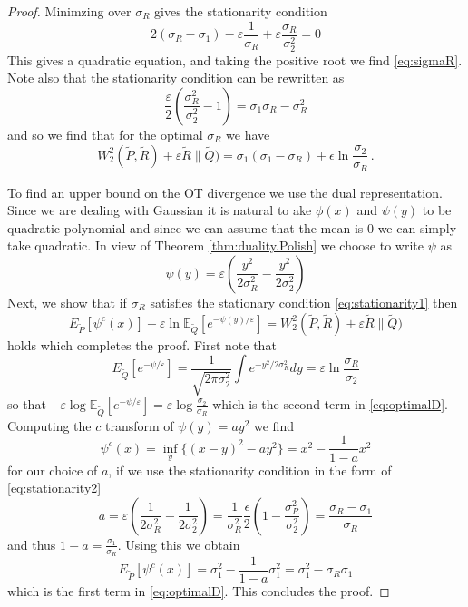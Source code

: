 \documentclass{amsart}
\theoremstyle{definition}
\theoremstyle{remark}
\numberwithin{equation}{section}
\begin{document}
\begin{proof}
Minimzing over $\sigma_R$ gives the
stationarity condition
\begin{equation}\label{eq:stationarity1}
2 (\sigma_R - \sigma_1) - \varepsilon \frac{1}{\sigma_R} + \varepsilon \frac{\sigma_R}{\sigma_2^2} =0 
\end{equation}
This gives a quadratic equation, and taking the positive root we find 
\eqref{eq:sigmaR}.
Note also that the stationarity condition can be rewritten as 
\begin{equation}\label{eq:stationarity2}
\frac{\varepsilon}{2}\left( \frac{\sigma_R^2}{\sigma_2^2} -1\right) = \sigma_1 \sigma_R - \sigma_R^2
\end{equation}
and so we find that for the optimal $\sigma_R$ we have 
\begin{equation}\label{eq:optimalD}
W_2^2(\tilde{P},\tilde{R})+ \varepsilon \mathfrak{} \tilde{R}\|\tilde{Q})
=  \sigma_1 (\sigma_1 - \sigma_R) + \epsilon \ln \frac{\sigma_2}{\sigma_R} \,.
\end{equation}



To find an upper bound on the OT divergence we use the dual representation. Since we are dealing with Gaussian  it is natural to ake $\phi(x)$ and $\psi(y)$ to be quadratic polynomial and since we can assume that the mean is $0$ we can simply take quadratic. In view of Theorem \ref{thm:duality.Polish} 
we choose to write $\psi$ as
\begin{equation}
\psi(y) =  \varepsilon\left(\frac{y^2}{2 \sigma_R^2} -\frac{y^2}{2 \sigma_2^2}
\right)\end{equation}
Next, we show that if $\sigma_R$ satisfies the stationary condition \eqref{eq:stationarity1} 
then 
\[
E_{\tilde{P}}[\psi^c(x)] - \varepsilon \ln \mathbb{E}_{\tilde{Q}}[ e^{-\psi(y)/\varepsilon}]= 
W_2^2(\tilde{P},\tilde{R}) + \varepsilon \mathfrak{}\tilde{R}\|\tilde{Q})
\]
holds which completes the proof.  First note that 
\[
E_{\tilde{Q}}[e^{-\psi/\varepsilon}]
= \frac{1}{\sqrt{2 \pi \sigma_2^2}} \int e^{-y^2/2 \sigma_{R}^2} dy = \varepsilon\ln\frac{\sigma_R}{\sigma_2}
\]
so that $-\varepsilon \log \mathbb{E}_{\tilde{Q}}[e^{-\psi/\varepsilon}] = \varepsilon \log \frac{\sigma_2}{\sigma_R}$ which is the second term in \eqref{eq:optimalD}. 
Computing the $c$ transform of $\psi(y)=a y^2$ we find 
\begin{equation}
\psi^c(x)= \inf_{y}\{ (x-y)^2 - a y^2\} = x^2 - \frac{1}{1-a} x^2 
\end{equation}
for our choice of $a$, if we use the stationarity condition in the form of \eqref{eq:stationarity2}  
\[
a = \varepsilon\left(\frac{1}{2 \sigma_R^2} -\frac{1}{2 \sigma_2^2}
\right) = \frac{1}{\sigma_R^2} \frac{\epsilon}{2}\left( 1 - \frac{\sigma_R^2}{\sigma_2^2} \right)=\frac{\sigma_R-\sigma_1}{\sigma_R}
\]
and thus $1-a = \frac{\sigma_1}{\sigma_R}$. Using this we obtain
\[
E_{\tilde{P}}[\psi^c(x)]= \sigma_1^2 - \frac{1}{1-a} \sigma_1^2
=\sigma_1^2 - \sigma_R \sigma_1
\]
which is the first term in  \eqref{eq:optimalD}. 
This concludes the proof.


\end{proof}
\end{document}
